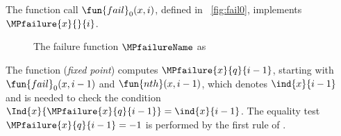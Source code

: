 
The function call
\(\fun{fail}_0(x,i)\), defined in
\fig~\vref{fig:fail0}, implements \(\MPfailure{x}{}{i}\).
\begin{figure}[t]
\abovedisplayskip=0pt
\belowdisplayskip=0pt
\caption{The failure function \(\MPfailureName\) as }
\label{fig:fail0}
\end{figure}
The function  (\emph{fixed point})
computes \(\MPfailure{x}{q}{i-1}\), starting with
\(\fun{fail}_0(x,i-1)\) and
\(\fun{nth}(x,i-1)\), which denotes
\(\ind{x}{i-1}\) and is needed to check the condition
\(\smash{\Ind{x}{\MPfailure{x}{q}{i-1}}} = \ind{x}{i-1}\). The
equality test \(\MPfailure{x}{q}{i-1} = -1\) is performed by the first
rule of .

